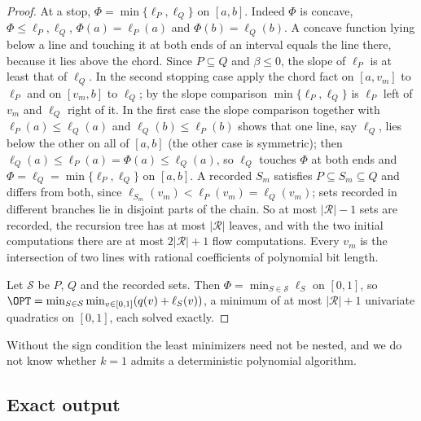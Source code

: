 \begin{proof}
At a stop, $\Phi=\min\{\ell_P,\ell_Q\}$ on $[a,b]$. Indeed $\Phi$ is
concave, $\Phi\le\ell_P,\ell_Q$, $\Phi(a)=\ell_P(a)$ and
$\Phi(b)=\ell_Q(b)$. A concave function lying below a line and touching
it at both ends of an interval equals the line there, because it lies
above the chord. Since $P\subseteq Q$ and $\beta\le0$, the slope of
$\ell_P$ is at least that of $\ell_Q$. In the second stopping case apply
the chord fact on $[a,v_m]$ to $\ell_P$ and on $[v_m,b]$ to $\ell_Q$; by
the slope comparison $\min\{\ell_P,\ell_Q\}$ is $\ell_P$ left of $v_m$ and
$\ell_Q$ right of it. In the first case the slope comparison together with
$\ell_P(a)\le\ell_Q(a)$ and $\ell_Q(b)\le\ell_P(b)$ shows that one line,
say $\ell_Q$, lies below the other on all of $[a,b]$ (the other case is
symmetric); then $\ell_Q(a)\le\ell_P(a)=\Phi(a)\le\ell_Q(a)$, so $\ell_Q$
touches $\Phi$ at both ends and $\Phi=\ell_Q=\min\{\ell_P,\ell_Q\}$ on
$[a,b]$. A recorded $S_m$ satisfies
$P\subseteq S_m\subseteq Q$ and differs from both, since
$\ell_{S_m}(v_m)<\ell_P(v_m)=\ell_Q(v_m)$; sets recorded in different
branches lie in disjoint parts of the chain. So at most $|\mathcal R|-1$
sets are recorded, the recursion tree has at most $|\mathcal R|$ leaves,
and with the two initial computations there are at most
$2|\mathcal R|+1$ flow computations. Every $v_m$ is the intersection of two
lines with rational coefficients of polynomial bit length.

Let $\mathcal S$ be $P$, $Q$ and the recorded sets. Then
$\Phi=\min_{S\in\mathcal S}\ell_S$ on $[0,1]$, so
$\OPT=\min_{S\in\mathcal S}\min_{v\in[0,1]}(q(v)+\ell_S(v))$, a minimum of
at most $|\mathcal R|+1$ univariate quadratics on $[0,1]$, each solved
exactly.
\end{proof}

Without the sign condition the least minimizers need not be nested, and
we do not know whether $k=1$ admits a deterministic polynomial algorithm.

\subsection{Exact output}\label{sec:cr-exact}

